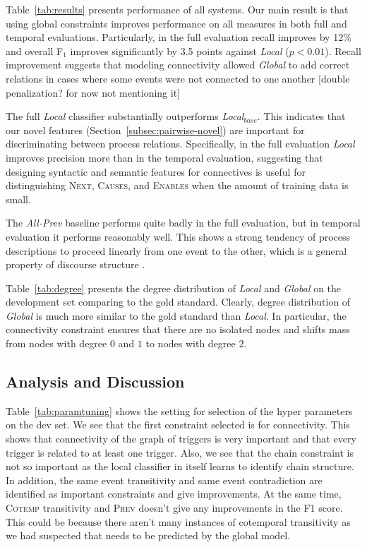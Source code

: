 Table~\ref{tab:results} presents performance of all systems. Our main result is that using global constraints improves performance on all measures in both full and temporal evaluations. Particularly, in the full evaluation recall improves by 12\% and overall F$_1$ improves significantly by 3.5 points against \emph{Local} ($p<0.01$). Recall improvement suggests that modeling connectivity allowed \emph{Global} to add correct relations in cases where some events were not connected to one another [double penalization? for now not mentioning it]

The full \emph{Local} classifier substantially outperforms \emph{Local$_{base}$}. This indicates that our novel features (Section~\ref{subsec:pairwise-novel}) are important for discriminating between process relations. Specifically, in the full evaluation \emph{Local} improves precision more than in the temporal evaluation, suggesting that designing syntactic and semantic features for connectives is useful for distinguishing \textsc{Next}, \textsc{Causes}, and \textsc{Enables} when the amount of training data is small.

The \emph{All-Prev} baseline performs quite badly in the full evaluation, but in temporal evaluation it performs reasonably well. This shows a strong tendency of process descriptions to proceed linearly from one event to the other, which is a general property of discourse structure \cite{schegloff73}.

Table~\ref{tab:degree} presents the degree distribution of \emph{Local} and \emph{Global} on the development set comparing to the gold standard. Clearly, degree distribution of \emph{Global} is much more similar to the gold standard than \emph{Local}. In particular, the connectivity constraint ensures that there are no isolated nodes and shifts mass from nodes with degree $0$ and $1$ to nodes with degree $2$.


\subsection{Analysis and Discussion}

Table~\ref{tab:paramtuning} shows the setting for selection of the hyper parameters on the dev set. We see that the first constraint selected is for connectivity. This shows that connectivity of the graph of triggers is very important and that every trigger is related to at least one trigger. Also, we see that the chain constraint is not so important as the local classifier in itself learns to identify chain structure. In addition, the same event transitivity and same event contradiction are identified as important constraints and give improvements. At the same time, \textsc{Cotemp} transitivity and \textsc{Prev} doesn't give any improvements in the F1 score. This could be because there aren't many instances of cotemporal transitivity as we had suspected that needs to be predicted by the global model.

